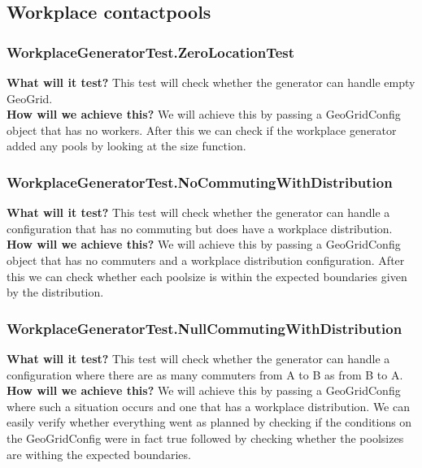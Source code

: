 \documentclass{article}
\begin{document}
\subsection{Workplace contactpools}

\subsubsection{WorkplaceGeneratorTest.ZeroLocationTest}
\textbf{What will it test?}
This test will check whether the generator can handle empty GeoGrid.\\
\newline
\textbf{How will we achieve this?}
We will achieve this by passing a GeoGridConfig object that has no workers. After this we can check if the workplace generator added any pools by looking at the size function.

\subsubsection{WorkplaceGeneratorTest.NoCommutingWithDistribution}
\textbf{What will it test?}
This test will check whether the generator can handle a configuration that has no commuting but does have a workplace distribution.\\
\newline
\textbf{How will we achieve this?}
We will achieve this by passing a GeoGridConfig object that has no commuters and a workplace distribution configuration. After this we can check whether each poolsize is within the expected boundaries given by the distribution.

\newpage

\subsubsection{WorkplaceGeneratorTest.NullCommutingWithDistribution}
\textbf{What will it test?}
This test will check whether the generator can handle a configuration where there are as many commuters from A to B as from B to A.\\
\newline
\textbf{How will we achieve this?}
We will achieve this by passing a GeoGridConfig where such a situation occurs and one that has a workplace distribution. We can easily verify whether everything went as planned by checking if the conditions on the GeoGridConfig were in fact true followed by checking whether the poolsizes are withing the expected boundaries.
\end{document}
